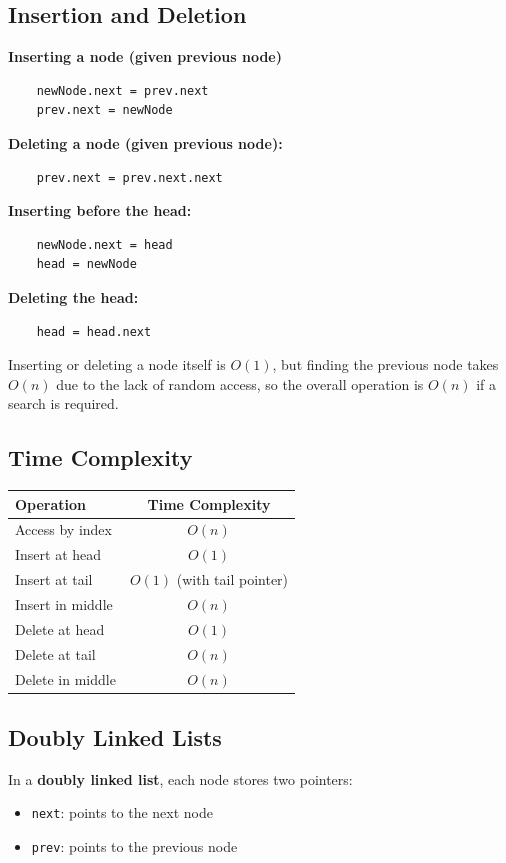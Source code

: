 \documentclass{article}
\begin{document}
\subsection{Insertion and Deletion}

\textbf{Inserting a node (given previous node)}
\begin{verbatim}
    newNode.next = prev.next
    prev.next = newNode
\end{verbatim}
\textbf{Deleting a node (given previous node):}
\begin{verbatim}
    prev.next = prev.next.next
\end{verbatim}
\textbf{Inserting before the head:}
\begin{verbatim}
    newNode.next = head
    head = newNode
\end{verbatim}
\textbf{Deleting the head:}
\begin{verbatim}
    head = head.next
\end{verbatim}

Inserting or deleting a node itself is $O(1)$, but finding the previous node takes $O(n)$ due to the lack of random access, so the overall operation is $O(n)$ if a search is required.

\subsection{Time Complexity}

\begin{center}
\begin{tabular}{l c}
\toprule
\textbf{Operation} & \textbf{Time Complexity} \\
\midrule
Access by index & $O(n)$ \\
Insert at head & $O(1)$ \\
Insert at tail & $O(1)$ (with tail pointer) \\
Insert in middle & $O(n)$ \\
Delete at head & $O(1)$ \\
Delete at tail & $O(n)$ \\
Delete in middle & $O(n)$ \\
\bottomrule
\end{tabular}
\end{center}

\subsection{Doubly Linked Lists}
In a \textbf{doubly linked list}, each node stores two pointers:
\begin{itemize}
  \item \texttt{next}: points to the next node
  \item \texttt{prev}: points to the previous node
\end{itemize}
\end{document}
